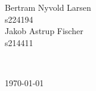 \begin{titlepage}
\begin{minipage}{0.3\textwidth}
\begin{flushleft}
            Bertram Nyvold Larsen \\ 
            s224194 \\[0.8cm]

            Jakob Astrup Fischer \\
            s214411 \\[0.8cm]
            
		\end{flushleft}
	\end{minipage} 
    \\[1cm]
    \vfill \vfill


    


	
	\vfill\vfill\vfill %
	
	{\large \today} %
	
	\vfill %
	
\end{titlepage}